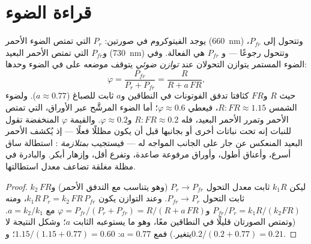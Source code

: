 \section{قراءة الضوء}

\begin{theorem}\label{thm:b2:plant-plasticity:phytochrome}
يوجد الفيتوكروم في صورتين: $P_r$ التي تمتص الضوء الأحمر
(\qty{660}{nm}) وتتحول إلى $P_{fr}$، و$P_{fr}$ التي
تمتص الأحمر البعيد (\qty{730}{nm}) وتتحول رجوعًا --- و
$P_{fr}$ هي الفعالة. وفي الضوء المستمر يتوازن التحولان
عند \emph{توازن ضوئي} يتوقف موضعه على  في الضوء وحدها:
\[
\varphi = \frac{P_{fr}}{P_{r} + P_{fr}} = \frac{R}{R + a\,FR},
\]
حيث $R$ و$FR$ كثافتا تدفق الفوتونات في النطاقين
و$a$ ثابت للصباغ ($a \approx 0.77$). ولضوء الشمس
$R{:}FR \approx 1.15$، فيعطي $\varphi \approx 0.6$؛ أما الضوء المرشَّح
عبر الأوراق، التي تمتص الأحمر وتمرر الأحمر البعيد، فله $R{:}FR
\approx 0.2$ و$\varphi \approx 0.2$. والقيمة $\varphi$ المنخفضة تقول للنبات
إنه تحت نباتات أخرى أو بجانبها قبل أن يكون مظللًا
فعلًا --- إذ يُكشف الأحمر البعيد المنعكس عن جار على
الجانب المواجه له --- فيستجيب \emph{بمتلازمة }: استطالة ساق أسرع، وأعناق أطول، وأوراق مرفوعة
صاعدة، وتفرع أقل، وإزهار أبكر. والبادرة في مظلة مغلقة
تضاعف معدل استطالتها.
\end{theorem}
\begin{proof}
ليكن $k_1 R$ ثابت معدل التحول $P_r \to P_{fr}$ (وهو يتناسب
مع التدفق الأحمر) و$k_2\,FR$ ثابت التحول $P_{fr} \to P_r$. وعند
التوازن يكون $k_1 R\,P_r = k_2\,FR\,P_{fr}$، ومنه $P_{fr}/P_r = k_1 R/
(k_2 FR)$ و$\varphi = P_{fr}/(P_r + P_{fr}) = R/(R + a\,FR)$ مع
$a = k_2/k_1$. (وتمتص الصورتان قليلًا في النطاقين معًا، وهو ما
يستوعبه الثابت $a$؛ وشكل النتيجة لا يتغير.) فمع
$a = 0.77$: $1.15/(1.15 + 0.77) = 0.60$؛ و$0.2/(0.2 + 0.77) = 0.21$.
\end{proof}

